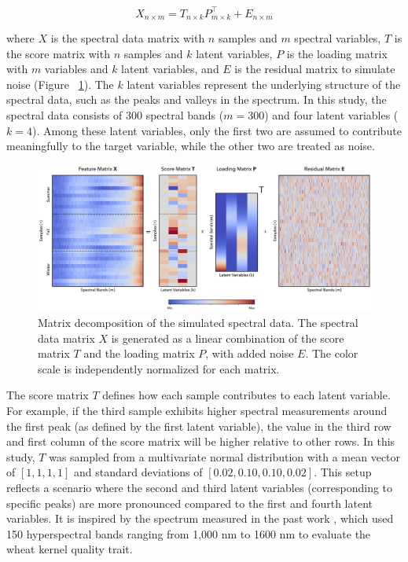 \begin{equation} \label{eq_spectral}
    X_{n \times m} = T_{n \times k} P_{m \times k}^\top + E_{n \times m} 
\end{equation}

where $X$ is the spectral data matrix with $n$ samples and $m$ spectral variables, $T$ is the score matrix with $n$ samples and $k$ latent variables, $P$ is the loading matrix with $m$ variables and $k$ latent variables, and $E$ is the residual matrix to simulate noise (Figure ~\ref{fig:1_sim_data}). The $k$ latent variables represent the underlying structure of the spectral data, such as the peaks and valleys in the spectrum. In this study, the spectral data consists of 300 spectral bands ($m = 300$) and four latent variables ($k = 4$). Among these latent variables, only the first two are assumed to contribute meaningfully to the target variable, while the other two are treated as noise.

\begin{figure}[H]
    \centering
    \includegraphics[width=1\textwidth]{fig_1.jpg}
    \caption{Matrix decomposition of the simulated spectral data. The spectral data matrix $X$ is generated as a linear combination of the score matrix $T$ and the loading matrix $P$, with added noise $E$. The color scale is independently normalized for each matrix.}
    \label{fig:1_sim_data}
\end{figure}

The score matrix $T$ defines how each sample contributes to each latent variable. For example, if the third sample exhibits higher spectral measurements around the first peak (as defined by the first latent variable), the value in the third row and first column of the score matrix will be higher relative to other rows. In this study, $T$ was sampled from a multivariate normal distribution with a mean vector of $[1, 1, 1, 1]$ and standard deviations of $[0.02, 0.10, 0.10, 0.02]$. This setup reflects a scenario where the second and third latent variables (corresponding to specific peaks) are more pronounced compared to the first and fourth latent variables. It is inspired by the spectrum measured in the past work \citep{chen_independent_2023}, which used 150 hyperspectral bands ranging from 1,000 nm to 1600 nm to evaluate the wheat kernel quality trait.

